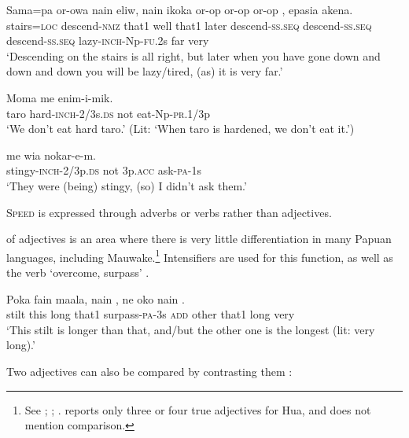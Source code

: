 \ea%
\label{ex:3:x1419}
\gll Sama=pa or-owa nain eliw, nain ikoka or-op or-op or-op , epasia akena.\\
stairs=\textsc{loc} descend-\textsc{nmz} that1 well that1 later descend-\textsc{ss}.\textsc{seq} descend-\textsc{ss}.\textsc{seq} descend-\textsc{ss}.\textsc{seq} lazy-\textsc{inch}-Np-\textsc{fu}.2s far very\\
\glt`Descending on the stairs is all right, but later when you have gone down and down and down you will be lazy/tired, (as) it is very far.'
\z

\ea%
\label{ex:3:x79}
\gll Moma   me enim-i-mik. \\
taro hard-\textsc{inch}-2/3s.\textsc{ds} not eat-Np-\textsc{pr}.1/3p\\
\glt`We don't eat hard taro.' (Lit: `When taro is hardened, we don't eat it.')
\z

\ea%
\label{ex:3:x80}
\gll {} me wia nokar-e-m. \\
stingy-\textsc{inch}-2/3p.\textsc{ds} not 3p.\textsc{acc} ask-\textsc{pa}-1s\\
\glt`They were (being) stingy, (so) I didn't ask them.'
\z

\textsc{Speed} is expressed through adverbs or verbs rather than adjectives.

 of adjectives is an area where there is very little differentiation in many Papuan languages, including Mauwake.\footnote{See \citet[134--135]{Roberts1987}; \citet[68]{Reesink1987}; \citet[63--64]{Hardin2002}. \citet[268]{Haiman1980} reports only three or four true adjectives for Hua, and does not mention comparison.} Intensifiers are used for this function, as well as the verb  `overcome, surpass' . 

\ea%
\label{ex:3:x81}
\gll Poka fain maala, nain , ne oko nain  .\\
stilt this long that1 surpass-\textsc{pa}-3s \textsc{add} other that1 long very\\
\glt`This stilt is longer than that, and/but the other one is the longest (lit: very long).'
\z

Two adjectives can also be compared by contrasting them : 

